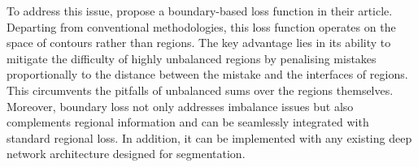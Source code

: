 \documentclass[onecolumn]{article}
\begin{document}


To address this issue, \citet{kervadec_boundary_2021} propose a boundary-based loss function in their article. Departing from conventional methodologies, this loss function operates on the space of contours rather than regions. The key advantage lies in its ability to mitigate the difficulty of highly unbalanced regions by penalising mistakes proportionally to the distance between the mistake and the interfaces of regions. This circumvents the pitfalls of unbalanced sums over the regions themselves. Moreover, boundary loss not only addresses imbalance issues but also complements regional information and can be seamlessly integrated with standard regional loss. In addition, it can be implemented with any existing deep network architecture designed for segmentation. 
\end{document}
